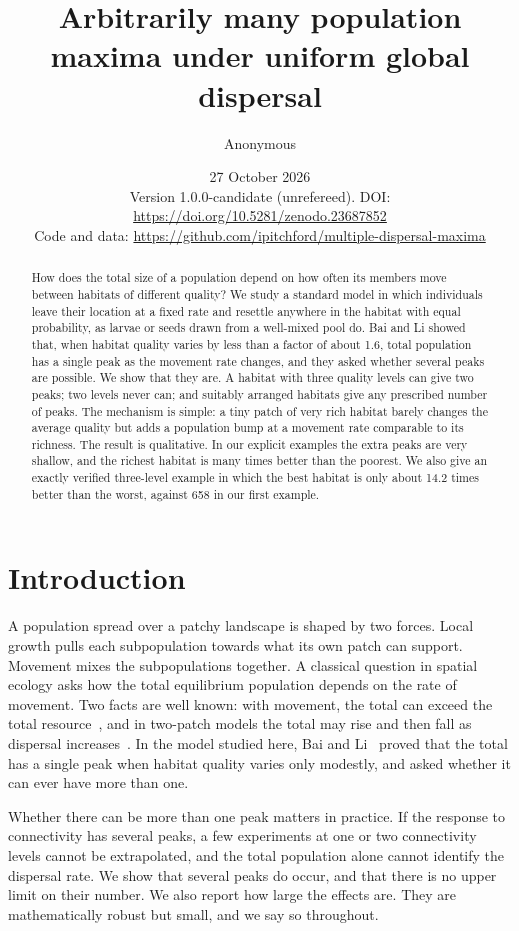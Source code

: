 \documentclass[11pt]{article}
\title{Arbitrarily many population maxima under uniform global dispersal}
\author{Anonymous}
\date{27 October 2026\\[2pt]
\small Version 1.0.0-candidate (unrefereed). DOI: \url{https://doi.org/10.5281/zenodo.23687852}\\
\small Code and data: \url{https://github.com/ipitchford/multiple-dispersal-maxima}}
\theoremstyle{remark}
\begin{document}
\maketitle
\begin{abstract}
How does the total size of a population depend on how often its members
move between habitats of different quality? We study a standard model in
which individuals leave their location at a fixed rate and resettle
anywhere in the habitat with equal probability, as larvae or seeds drawn
from a well-mixed pool do. Bai and Li showed that, when habitat quality
varies by less than a factor of about 1.6, total population has a single
peak as the movement rate changes, and they asked whether several peaks
are possible. We show that they are. A habitat with three quality levels
can give two peaks; two levels never can; and suitably arranged habitats
give any prescribed number of peaks. The mechanism is simple: a tiny
patch of very rich habitat barely changes the average quality but adds
a population bump at a movement rate comparable to its richness. The
result is qualitative. In our explicit examples the extra peaks are very
shallow, and the richest habitat is many times better than the poorest.
We also give an exactly verified three-level example in which the best
habitat is only about 14.2 times better than the worst, against 658 in
our first example.
\end{abstract}

\section{Introduction}

A population spread over a patchy landscape is shaped by two forces.
Local growth pulls each subpopulation towards what its own patch can
support. Movement mixes the subpopulations together. A classical question
in spatial ecology asks how the total equilibrium population depends on
the rate of movement. Two facts are well known: with movement, the total
can exceed the total resource~\cite{Lou2006,DeAngelisNiZhang2016}, and in
two-patch models the total may rise and then fall as dispersal
increases~\cite{FreedmanWaltman1977,ArditiLobrySari2015,GaoLou2022}. In the
model studied here, Bai and Li~\cite{BaiLi2021} proved that the total has
a single peak when habitat quality varies only modestly, and asked whether
it can ever have more than one.

Whether there can be more than one peak matters in practice. If the
response to connectivity has several peaks, a few experiments at one or
two connectivity levels cannot be extrapolated, and the total population
alone cannot identify the dispersal rate. We show that several peaks do
occur, and that there is no upper limit on their number. We also report
how large the effects are. They are mathematically robust but small, and
we say so throughout.
\end{document}
